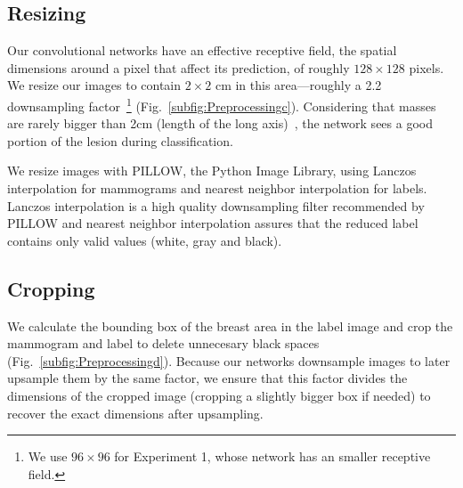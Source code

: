 \subsection{Resizing}
Our convolutional networks have an effective receptive field, the spatial dimensions around a pixel that affect its prediction, of roughly $128 \times 128$ pixels.
We resize our images to contain $2 \times 2$ cm in this area---roughly a 2.2 downsampling factor~\footnote{We use $96 \times 96$ for Experiment 1, whose network has an smaller receptive field.} (Fig.~\ref{subfig:Preprocessingc}). Considering that masses are rarely bigger than 2cm (length of the long axis)~\cite{Sahiner1996}, the network sees a good portion of the lesion during classification. 

We resize images with PILLOW, the Python Image Library, using Lanczos interpolation for mammograms and nearest neighbor interpolation for labels. Lanczos interpolation is a high quality downsampling filter recommended by PILLOW and nearest neighbor interpolation assures that the reduced label contains only valid values (white, gray and black).

\subsection{Cropping}
We calculate the bounding box of the breast area in the label image and crop the mammogram and label to delete unnecesary black spaces (Fig.~\ref{subfig:Preprocessingd}). 
Because our networks downsample images to later upsample them by the same factor, we ensure that this factor divides the dimensions of the cropped image (cropping a slightly bigger box if needed) to recover the exact dimensions after upsampling.

